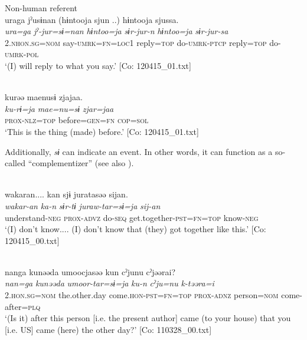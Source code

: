 \ex
  Non-human referent\\
{\TM}
\glll uraga  jˀusɨnan  (hɨntooja  sjun ..)    hɨntooja  sjussa.\\
\textit{ura=ga}  \textit{jˀ-jur=sɨ=nan}  \textit{hɨntoo=ja}  \textit{sɨr-jur-n} \textit{hɨntoo=ja}  \textit{sɨr-jur-sa}\\
2.\textsc{nhon}.\textsc{sg}=\textsc{nom}  say-\textsc{umrk}=\textsc{fn}=\textsc{loc1}  reply=\textsc{top}  do-\textsc{umrk}-\textsc{ptcp}   reply=\textsc{top}  do-\textsc{umrk}-\textsc{pol}\\
\glt ‘(I) will reply to what you say.’ [Co: 120415\_01.txt]

\ex{}\\
{\TM}
\glll  kurəə  {\textbar}mae{\textbar}nusɨ  zjajaa.\\
\textit{ku-rɨ=ja}  \textit{mae=nu=sɨ}  \textit{zjar=jaa}\\
\textsc{prox}-\textsc{nlz}=\textsc{top}  before=\textsc{gen}=\textsc{fn}  \textsc{cop}=\textsc{sol}\\
\glt ‘This is the thing (made) before.’ [Co: 120415\_01.txt]
\z
\z

Additionally, \textit{sɨ} can indicate an event. In other words, it can function as a so-called “complementizer” (see also ).

\ea\label{ex:6-11}
\ea{}\\
{\TM}
\glll  wakaran....  kan  sjɨ  juratasəə sijan.\\
\textit{wakar-an}  \textit{ka-n}  \textit{sɨr-tɨ}  \textit{juraw-tar=sɨ=ja} \textit{sij-an}\\
understand-\textsc{neg}  \textsc{prox}-\textsc{advz}  do-\textsc{seq}  get.together-\textsc{pst}=\textsc{fn}=\textsc{top}     know-\textsc{neg}\\
\glt ‘(I) don’t know.... (I) don’t know that (they) got together like this.’ [Co: 120415\_00.txt]

\ex{}\\
{\TM}
\glll  nanga  kunəəda  umoocjasəə  kun  cˀjunu  cˀjəərai?\\
\textit{nan=ga}  \textit{kunəəda}  \textit{umoor-tar=sɨ=ja}  \textit{ku-n}   \textit{cˀju=nu}  \textit{k-təəra=i}\\
2.\textsc{hon}.\textsc{sg}=\textsc{nom}  the.other.day  come.\textsc{hon}-\textsc{pst}=\textsc{fn}=\textsc{top}  \textsc{prox}-\textsc{adnz}   person=\textsc{nom}  come-after=\textsc{plq}\\
\glt ‘(Is it) after this person [i.e. the present author] came (to your house) that you [i.e. US] came (here) the other day?’ [Co: 110328\_00.txt]
\z
\z

